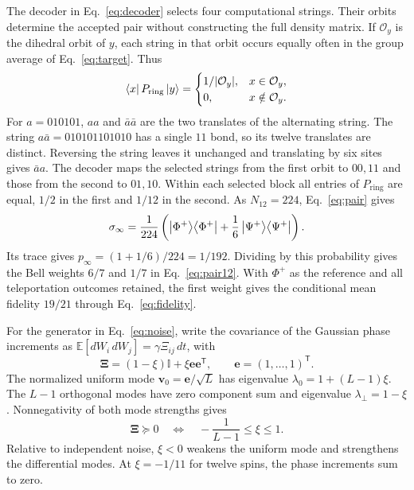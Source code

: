 \documentclass[aps,prl,reprint,amsmath,amssymb,floatfix,superscriptaddress]{revtex4-2}
\newcommand{\Psym}{P_{\mathrm{ring}}}
\begin{document}
\label{App:B}
The decoder in Eq.~\eqref{eq:decoder} selects four computational strings. Their orbits determine the accepted pair without constructing the full density matrix. If $\mathcal O_y$ is the dihedral orbit of $y$, each string in that orbit occurs equally often in the group average of Eq.~\eqref{eq:target}. Thus
\begin{equation}
\bra x\Psym\ket y=\begin{cases}1/|\mathcal O_y|,&x\in\mathcal O_y,\\0,&x\notin\mathcal O_y.\end{cases}
\label{eq:orbits}
\end{equation}
For $a=010101$, $aa$ and $\bar a\bar a$ are the two translates of the alternating string. The string $a\bar a=010101101010$ has a single $11$ bond, so its twelve translates are distinct. Reversing the string leaves it unchanged and translating by six sites gives $\bar a a$. The decoder maps the selected strings from the first orbit to $00,11$ and those from the second to $01,10$. Within each selected block all entries of $\Psym$ are equal, $1/2$ in the first and $1/12$ in the second. As $N_{12}=224$, Eq.~\eqref{eq:pair} gives
\begin{equation}
\sigma_\infty=\frac{1}{224}\left(\ket{\Phi^+}\!\bra{\Phi^+}
+\frac{1}{6}\ket{\Psi^+}\!\bra{\Psi^+}\right).
\end{equation}
Its trace gives $p_\infty=(1+1/6)/224=1/192$. Dividing by this probability gives the Bell weights $6/7$ and $1/7$ in Eq.~\eqref{eq:pair12}. With $\Phi^+$ as the reference and all teleportation outcomes retained, the first weight gives the conditional mean fidelity $19/21$ through Eq.~\eqref{eq:fidelity}.

\label{app:Log-neg}
For the generator in Eq.~\eqref{eq:noise}, write the covariance of the Gaussian phase increments as $\mathbb E[dW_i\,dW_j]=\gamma\Xi_{ij}\,dt$, with
\begin{equation}
\bm\Xi=(1-\xi)\mathbb I+\xi\bm e\bm e^{\mathsf T},
\qquad \bm e=(1,\ldots,1)^{\mathsf T}.
\label{eq:noise_covariance}
\end{equation}
The normalized uniform mode $\bm v_0=\bm e/\sqrt L$ has eigenvalue $\lambda_0=1+(L-1)\xi$. The $L-1$ orthogonal modes have zero component sum and eigenvalue $\lambda_\perp=1-\xi$. Nonnegativity of both mode strengths gives
\begin{equation}
\bm\Xi\succeq0\quad\Longleftrightarrow\quad
-\frac{1}{L-1}\le\xi\le1.
\label{eq:noise_range}
\end{equation}
Relative to independent noise, $\xi<0$ weakens the uniform mode and strengthens the differential modes. At $\xi=-1/11$ for twelve spins, the phase increments sum to zero.
\end{document}
